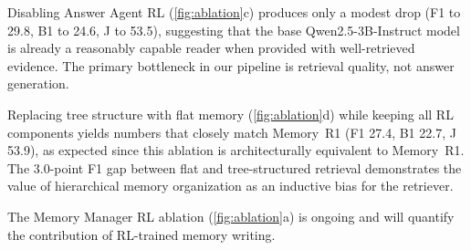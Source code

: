 Disabling Answer Agent RL (\autoref{fig:ablation}c) produces only a modest drop (F1 to 29.8, B1 to 24.6, J to 53.5), suggesting that the base Qwen2.5-3B-Instruct model is already a reasonably capable reader when provided with well-retrieved evidence. The primary bottleneck in our pipeline is retrieval quality, not answer generation.

Replacing tree structure with flat memory (\autoref{fig:ablation}d) while keeping all RL components yields numbers that closely match Memory~R1 (F1 27.4, B1 22.7, J 53.9), as expected since this ablation is architecturally equivalent to Memory~R1. The 3.0-point F1 gap between flat and tree-structured retrieval demonstrates the value of hierarchical memory organization as an inductive bias for the retriever.

The Memory Manager RL ablation (\autoref{fig:ablation}a) is ongoing and will quantify the contribution of RL-trained memory writing.
